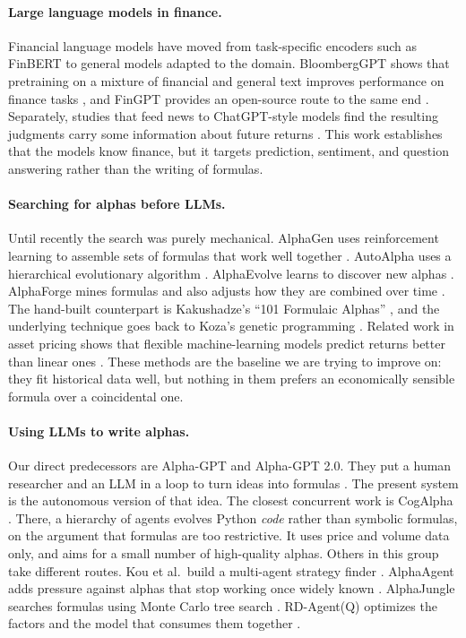 \documentclass{article}
\theoremstyle{definition}
\theoremstyle{plain}
\theoremstyle{remark}
\begin{document}
\paragraph{Large language models in finance.} Financial language models have moved from
task-specific encoders such as FinBERT \cite{finbert} to general models adapted to the
domain. BloombergGPT shows that pretraining on a mixture of financial and general text
improves performance on finance tasks \cite{bloomberggpt}, and FinGPT provides an
open-source route to the same end \cite{fingpt}. Separately, studies that feed news to
ChatGPT-style models find the resulting judgments carry some information about future
returns \cite{lopezlira}. This work establishes that the models know finance, but it
targets prediction, sentiment, and question answering rather than the writing of
formulas.

\paragraph{Searching for alphas before LLMs.} Until recently the search was purely
mechanical. AlphaGen uses reinforcement learning to assemble sets of formulas that work
well together \cite{alphagen}. AutoAlpha uses a hierarchical evolutionary algorithm
\cite{autoalpha-evo}. AlphaEvolve learns to discover new alphas
\cite{alphaevolve-mining}. AlphaForge mines formulas and also adjusts how they are
combined over time \cite{alphaforge}. The hand-built counterpart is Kakushadze's ``101
Formulaic Alphas'' \cite{101alphas}, and the underlying technique goes back to Koza's
genetic programming \cite{koza}. Related work in asset pricing shows that flexible
machine-learning models predict returns better than linear ones \cite{gukellyxiu}. These
methods are the baseline we are trying to improve on: they fit historical data well, but
nothing in them prefers an economically sensible formula over a coincidental one.

\paragraph{Using LLMs to write alphas.} Our direct predecessors are Alpha-GPT and
Alpha-GPT 2.0. They put a human researcher and an LLM in a loop to turn ideas into
formulas \cite{alphagpt1,alphagpt2}. The present system is the autonomous version of that
idea. The closest concurrent work is CogAlpha \cite{cogalpha}. There, a hierarchy of
agents evolves Python \emph{code} rather than symbolic formulas, on the argument that
formulas are too restrictive. It uses price and volume data only, and aims for a small
number of high-quality alphas. Others in this group take different routes. Kou et al.\
build a multi-agent strategy finder \cite{autoalpha-llm}. AlphaAgent adds pressure
against alphas that stop working once widely known \cite{alphaagent}. AlphaJungle
searches formulas using Monte Carlo tree search \cite{alphajungle}. RD-Agent(Q) optimizes
the factors and the model that consumes them together \cite{rdagent}.
\end{document}
